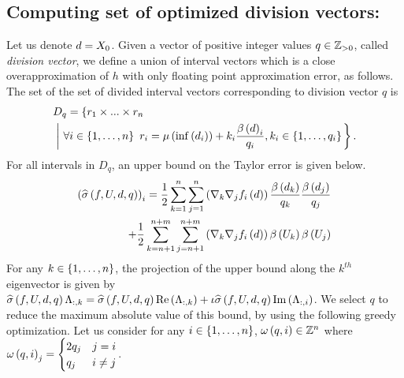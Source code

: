 \subsection{Computing set of optimized division vectors:}
Let us denote $d=X_0$.  Given a vector of positive integer
values $q\in\mathbb{Z}_{>0}$, called \emph{division vector}, we define
a union of interval vectors which is a close overapproximation of $h$
with only floating point approximation error, as follows.  The set of
the set of divided interval vectors corresponding to division vector
$q$ is
%
\begin{align*}
& D_q
= \left\{r_1\times...\times r_n\right.\\
& \left.\left|~\forall i\in\left\{1,\ldots,n\right\}~r_i
= \mu\left(\inf\left(d_i\right)\right)+k_i\frac{\beta\left(d\right)_i}{q_i}, k_i\in\left\{1,\ldots,q_i\right\}\right.\right\}.
\end{align*}
%
For all intervals in $D_q$, an upper bound on the Taylor error is
given below.
%
\begin{align*}
\left(\widehat{\sigma}\left(f,U,d,q\right)\right)_i
= \frac{1}{2}\sum_{k=1}^{n}\sum_{j=1}^{n}\left(\nabla_k\nabla_j{f_i}\left(d\right)\right)\frac{\beta\left(d_k\right)}{q_k}\frac{\beta\left(d_j\right)}{q_j}
\\
+ \frac{1}{2}\sum_{k=n+1}^{n+m}\sum_{j=n+1}^{n+m}\left(\nabla_k\nabla_j{f_i}\left(d\right)\right)\beta\left(U_k\right)\beta\left(U_j\right)
\end{align*}
%
For any $k\in\left\{1,\ldots,n\right\}$, the projection of the upper bound
along the $k^{th}$ eigenvector is given by
$\widehat{\sigma}\left(f,U,d,q\right)\Lambda_{:,k}
= \widehat{\sigma}\left(f,U,d,q\right)\operatorname{Re}\left(\Lambda_{:,k}\right)
+ \iota\widehat{\sigma}\left(f,U,d,q\right)\operatorname{Im}\left(\Lambda_{:,i}\right)$.  We select $q$ to
reduce the maximum absolute value of this bound, by using the
following greedy optimization.  Let us consider for any
$i\in\left\{1,\ldots,n\right\}$, $\omega\left(q,i\right)\in\mathbb{Z}^n$ where $\omega\left(q,i\right)_j
= \begin{cases}2q_j & j=i\\ q_j & i\neq j \end{cases}$.

